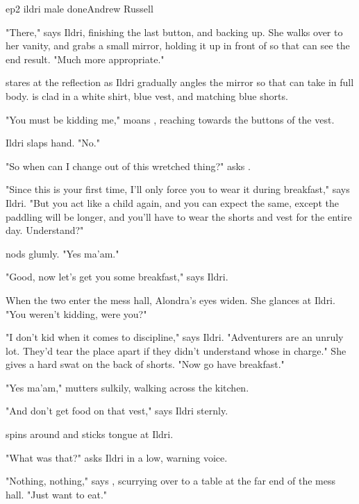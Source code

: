 \documentclass{book}
\begin{document}
\begin{childnode}{ep2 ildri male done}{Andrew Russell}

    "There," says Ildri, finishing the last button, and backing up. She walks over to her vanity, and grabs a small mirror, holding it up in front of \name{} so that \heshe{} can see the end 
    result. "Much more appropriate."

    \name{} stares at the reflection as Ildri gradually angles the mirror so that \name{} can take in \hisher{} full body. \HeShe{} is clad in a white shirt, blue vest, and matching blue shorts. 

    "You must be kidding me," moans \name{}, reaching towards the buttons of the vest.

    Ildri slaps \names{} hand. "No."

    "So when can I change out of this wretched thing?" asks \name{}.

    "Since this is your first time, I'll only force you to wear it during breakfast," says Ildri. "But you act like a child again, and you can expect the same, except the paddling will be longer,
    and you'll have to wear the shorts and vest for the entire day. Understand?"

    \name{} nods glumly. "Yes ma'am."

    "Good, now let's get you some breakfast," says Ildri.

    When the two enter the mess hall, Alondra's eyes widen. She glances at Ildri. "You weren't kidding, were you?"

    "I don't kid when it comes to discipline," says Ildri. "Adventurers are an unruly lot. They'd tear the place apart if they didn't understand whose in charge." She gives \name{} a hard
    swat on the back of \hisher{} shorts. "Now go have breakfast."

    "Yes ma'am," mutters \name{} sulkily, walking across the kitchen. 

    "And don't get food on that vest," says Ildri sternly.

    \name{} spins around and sticks \hisher{} tongue at Ildri.

    "What was that?" asks Ildri in a low, warning voice.

    "Nothing, nothing," says \name{}, scurrying over to a table at the far end of the mess hall. "Just want to eat."


\end{childnode}
\end{document}

